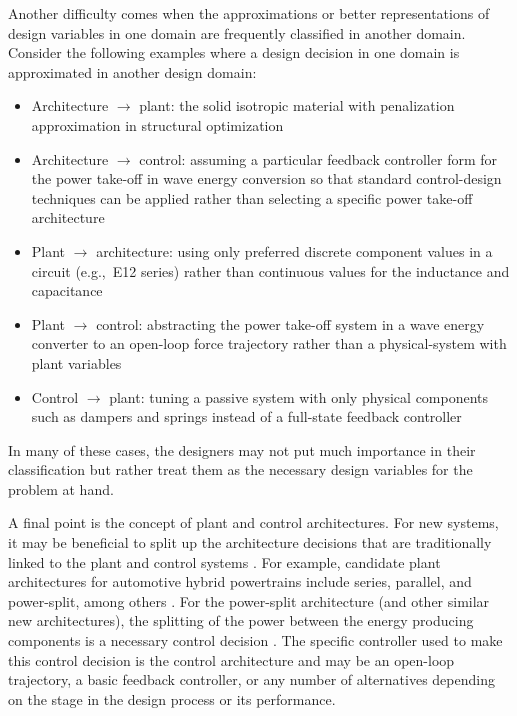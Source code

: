 Another difficulty comes when the approximations or better representations of design variables in one domain are frequently  classified in another domain.
Consider the following examples where a design decision in one domain is approximated in another design domain:
\begin{itemize}
\item Architecture $\to$ plant: the solid isotropic material with penalization approximation in structural optimization \cite{Bendsoe2004a, Lohan2016c}

\item Architecture $\to$ control: assuming a particular feedback controller form for the power take-off in wave energy conversion so that standard control-design techniques can be applied rather than selecting a specific power take-off architecture \cite{Falnes2002a}

\item Plant $\to$ architecture: using only preferred discrete component values in a circuit (e.g.,~E12 series) rather than continuous values for the inductance and capacitance \cite{Gan2010a}

\item Plant $\to$ control: abstracting the power take-off system in a wave energy converter to an open-loop force trajectory rather than a physical-system with plant variables \cite{Herber2013a, Herber2014a}

\item Control $\to$ plant: tuning a passive system with only physical components such as dampers and springs instead of a full-state feedback controller
\end{itemize}

\noindent In many of these cases, the designers may not put much importance in their classification but rather treat them as the necessary design variables for the problem at hand.

A final point is the concept of plant and control architectures.
For new systems, it may be beneficial to split up the architecture decisions that are traditionally linked to the plant and control systems \cite{Deshmukh2015a}.
For example, candidate plant architectures for automotive
hybrid powertrains include series, parallel, and power-split, among others \cite{Bayrak2015a}.
For the power-split architecture (and other similar new architectures), the splitting of the power between the energy producing components is a necessary control decision \cite{Bayrak2015a}.
The specific controller used to make this control decision is the control architecture and may be an open-loop trajectory, a basic feedback controller, or any number of alternatives depending on the stage in the design process or its performance.